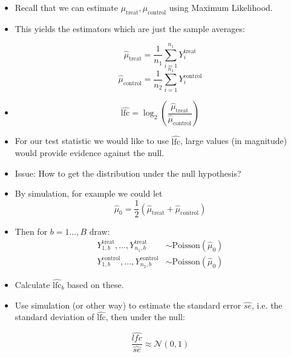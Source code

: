 \documentclass[red,xcolor={table,usenames,dvipsnames}]{beamer}
\begin{document}

\begin{frame}
  \begin{itemize}
    \item Recall that we can estimate  $\mu_{\text{treat}}, \mu_{\text{control}}$ using Maximum Likelihood.
    \item This yields the estimators which are just the sample averages:

     $$\hat{\mu}_{\text{treat}} = \frac{1}{n_1} \sum_{i=1}^{n_1} Y^{\text{treat}}_{i}$$
     $$\hat{\mu}_{\text{control}} = \frac{1}{n_2} \sum_{i=1}^{n_1} Y^{\text{control}}_{i}$$

    \item $$ \widehat{\text{lfc}} = \log_2\left(\frac{\hat{\mu}_{\text{treat}}}{\hat{\mu}_{\text{control}}} \right)$$
  \end{itemize}
\end{frame}





\begin{frame}
\begin{itemize}
    \item For our test statistic we would like to use $\widehat{\text{lfc}}$, large values (in magnitude) would provide evidence against the null.
    \item Issue: How to get the distribution under the null hypothesis?
    \item By simulation, for example we could let
    $$\hat{\mu}_0 = \frac{1}{2}\left(\hat{\mu}_{\text{treat}} + \hat{\mu}_{\text{control}}\right)$$
    \item Then for $b=1\dotsc,B$ draw:
  $$\begin{aligned}
Y^{\text{treat}}_{1,b},\dotsc, Y^{\text{treat}}_{n_1,b} &\sim \text{Poisson}(\hat{\mu}_0)\\
Y^{\text{control}}_{1,b},\dotsc, Y^{\text{control}}_{n_2,b} &\sim \text{Poisson}(\hat{\mu}_0)
\end{aligned}
$$
  \item Calculate $\widehat{\text{lfc}}_b$ based on these.
\end{itemize}
\end{frame}

\begin{frame}
\begin{itemize}
    \item Use simulation (or other way) to estimate the standard error $\widehat{se}$, i.e. the standard deviation of $\widehat{\text{lfc}}$, then under the null:

    $$ \frac{\widehat{lfc}}{\widehat{se}} \approx \mathcal{N}(0,1) $$
\end{itemize}
\end{frame}
\end{document}
